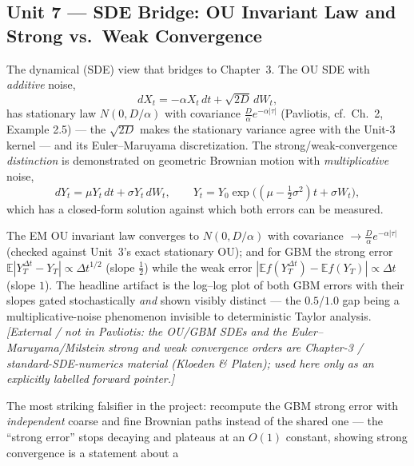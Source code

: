 \documentclass[11pt]{article}
\newcommand{\extnote}[1]{{\small\color{extgray}\emph{[External / not in Pavliotis: #1]}}}
\newcommand{\pav}[1]{{\small\color{hubblue}(Pavliotis, #1)}}
\newenvironment{brief}{%
  \begin{description}[style=sameline,leftmargin=2.3cm,font=\bfseries\color{hubblue}]
}{%
  \end{description}
}
\begin{document}
\subsection*{Unit 7 --- SDE Bridge: OU Invariant Law and Strong vs.\ Weak Convergence}
\begin{brief}
\item[Idea] The dynamical (SDE) view that bridges to Chapter~3. The OU SDE with \emph{additive} noise,
\begin{equation}
dX_t = -\alpha X_t\,dt + \sqrt{2D}\,dW_t,
\label{eq:ou-sde}
\end{equation}
has stationary law $N(0,D/\alpha)$ with covariance $\tfrac{D}{\alpha}e^{-\alpha|\tau|}$ \pav{cf.\
Ch.~2, Example 2.5} --- the $\sqrt{2D}$ makes the stationary variance agree with the Unit-3 kernel ---
and its Euler--Maruyama discretization. The strong/weak-convergence \emph{distinction} is demonstrated
on geometric Brownian motion with \emph{multiplicative} noise,
\begin{equation}
dY_t = \mu Y_t\,dt + \sigma Y_t\,dW_t, \qquad
Y_t = Y_0\exp\!\big((\mu-\tfrac12\sigma^2)t + \sigma W_t\big),
\label{eq:gbm}
\end{equation}
which has a closed-form solution against which both errors can be measured.
\item[Proves] The EM OU invariant law converges to $N(0,D/\alpha)$ with covariance $\to
\tfrac{D}{\alpha}e^{-\alpha|\tau|}$ (checked against Unit~3's exact stationary OU); and for GBM the
strong error $\mathbb{E}|Y^{\Delta t}_T-Y_T|\propto\Delta t^{1/2}$ (slope $\tfrac12$) while the weak
error $|\mathbb{E}f(Y_T^{\Delta t})-\mathbb{E}f(Y_T)|\propto\Delta t$ (slope $1$). The headline
artifact is the log--log plot of both GBM errors with their slopes gated stochastically \emph{and}
shown visibly distinct --- the $0.5$/$1.0$ gap being a multiplicative-noise phenomenon invisible to
deterministic Taylor analysis. \extnote{the OU/GBM SDEs and the Euler--Maruyama/Milstein strong and
weak convergence orders are Chapter-3 / standard-SDE-numerics material (Kloeden \& Platen); used here
only as an explicitly labelled forward pointer.}
\item[Falsifier] The most striking falsifier in the project: recompute the GBM strong error with
\emph{independent} coarse and fine Brownian paths instead of the shared one --- the ``strong error''
stops decaying and plateaus at an $O(1)$ constant, showing strong convergence is a statement about a

\end{brief}
\end{document}
